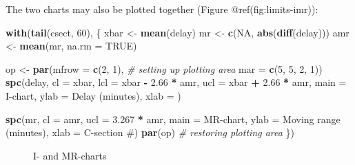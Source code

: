 \documentclass[
]{book}
\makeatletter
\newenvironment{Shaded}{\begin{snugshade}}{\end{snugshade}}
\newcommand{\AttributeTok}[1]{\textcolor[rgb]{0.13,0.29,0.53}{#1}}
\newcommand{\CommentTok}[1]{\textcolor[rgb]{0.56,0.35,0.01}{\textit{#1}}}
\newcommand{\ConstantTok}[1]{\textcolor[rgb]{0.56,0.35,0.01}{#1}}
\newcommand{\DecValTok}[1]{\textcolor[rgb]{0.00,0.00,0.81}{#1}}
\newcommand{\FloatTok}[1]{\textcolor[rgb]{0.00,0.00,0.81}{#1}}
\newcommand{\FunctionTok}[1]{\textcolor[rgb]{0.13,0.29,0.53}{\textbf{#1}}}
\newcommand{\NormalTok}[1]{#1}
\newcommand{\OtherTok}[1]{\textcolor[rgb]{0.56,0.35,0.01}{#1}}
\newcommand{\SpecialCharTok}[1]{\textcolor[rgb]{0.81,0.36,0.00}{\textbf{#1}}}
\newcommand{\StringTok}[1]{\textcolor[rgb]{0.31,0.60,0.02}{#1}}
\newcommand*\pandocbounded[1]{%
  \sbox\pandoc@box{#1}%
  \Gscale@div\@tempa{\textheight}{\dimexpr\ht\pandoc@box+\dp\pandoc@box\relax}%
  \Gscale@div\@tempb{\linewidth}{\wd\pandoc@box}%
  \ifdim\@tempb\p@<\@tempa\p@\let\@tempa\@tempb\fi%
  \ifdim\@tempa\p@<\p@\scalebox{\@tempa}{\usebox\pandoc@box}%
  \else\usebox{\pandoc@box}%
  \fi%
}
\makeatother
\begin{document}
The two charts may also be plotted together (Figure
@ref(fig:limits-imr)):

\begin{Shaded}
\begin{Highlighting}[]
\FunctionTok{with}\NormalTok{(}\FunctionTok{tail}\NormalTok{(csect, }\DecValTok{60}\NormalTok{), \{}
\NormalTok{  xbar }\OtherTok{\textless{}{-}} \FunctionTok{mean}\NormalTok{(delay)}
\NormalTok{  mr   }\OtherTok{\textless{}{-}} \FunctionTok{c}\NormalTok{(}\ConstantTok{NA}\NormalTok{, }\FunctionTok{abs}\NormalTok{(}\FunctionTok{diff}\NormalTok{(delay)))}
\NormalTok{  amr  }\OtherTok{\textless{}{-}} \FunctionTok{mean}\NormalTok{(mr, }\AttributeTok{na.rm =} \ConstantTok{TRUE}\NormalTok{)}
  
\NormalTok{  op }\OtherTok{\textless{}{-}} \FunctionTok{par}\NormalTok{(}\AttributeTok{mfrow =} \FunctionTok{c}\NormalTok{(}\DecValTok{2}\NormalTok{, }\DecValTok{1}\NormalTok{),           }\CommentTok{\# setting up plotting area}
            \AttributeTok{mar   =} \FunctionTok{c}\NormalTok{(}\DecValTok{5}\NormalTok{, }\DecValTok{5}\NormalTok{, }\DecValTok{2}\NormalTok{, }\DecValTok{1}\NormalTok{))}
  \FunctionTok{spc}\NormalTok{(delay,}
      \AttributeTok{cl   =}\NormalTok{ xbar,}
      \AttributeTok{lcl  =}\NormalTok{ xbar }\SpecialCharTok{{-}} \FloatTok{2.66} \SpecialCharTok{*}\NormalTok{ amr,}
      \AttributeTok{ucl  =}\NormalTok{ xbar }\SpecialCharTok{+} \FloatTok{2.66} \SpecialCharTok{*}\NormalTok{ amr,}
      \AttributeTok{main =} \StringTok{\textquotesingle{}I{-}chart\textquotesingle{}}\NormalTok{,}
      \AttributeTok{ylab =} \StringTok{\textquotesingle{}Delay (minutes)\textquotesingle{}}\NormalTok{,}
      \AttributeTok{xlab =} \StringTok{\textquotesingle{}\textquotesingle{}}\NormalTok{)}
  
  \FunctionTok{spc}\NormalTok{(mr,}
      \AttributeTok{cl   =}\NormalTok{ amr,}
      \AttributeTok{ucl  =} \FloatTok{3.267} \SpecialCharTok{*}\NormalTok{ amr,}
      \AttributeTok{main =} \StringTok{\textquotesingle{}MR{-}chart\textquotesingle{}}\NormalTok{,}
      \AttributeTok{ylab =} \StringTok{\textquotesingle{}Moving range (minutes)\textquotesingle{}}\NormalTok{,}
      \AttributeTok{xlab =} \StringTok{\textquotesingle{}C{-}section \#\textquotesingle{}}\NormalTok{)}
  \FunctionTok{par}\NormalTok{(op)                              }\CommentTok{\# restoring plotting area}
\NormalTok{\})}
\end{Highlighting}
\end{Shaded}

\begin{figure}
\centering
\pandocbounded{}
\caption{I- and MR-charts}
\end{figure}
\end{document}
